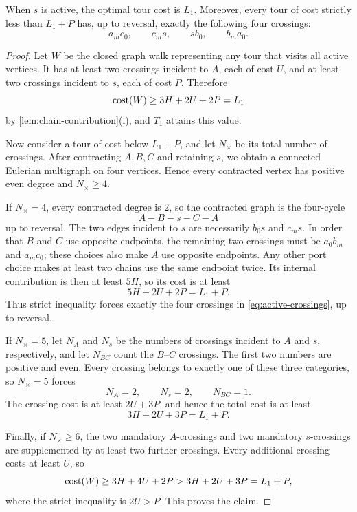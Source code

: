 \documentclass[12pt,a4paper,oneside]{report}
\begin{document}
\begin{lemma}\label{lem:active-low-cost}
When $s$ is active, the optimal tour cost is $L_1$.  Moreover, every tour of
cost strictly less than $L_1+P$ has, up to reversal, exactly the following
four crossings:
\begin{equation}\label{eq:active-crossings}
  a_mc_0,
  \qquad
  c_ms,
  \qquad
  sb_0,
  \qquad
  b_ma_0.
\end{equation}
\end{lemma}

\begin{proof}
Let $W$ be the closed graph walk representing any tour that visits all active
vertices.  It has at least two crossings incident to $A$, each of cost $U$,
and at least two crossings incident to $s$, each of cost $P$.  Therefore
\[
  \operatorname{cost}(W)\ge3H+2U+2P=L_1
\]
by \cref{lem:chain-contribution}(i), and $T_1$ attains this value.

Now consider a tour of cost below $L_1+P$, and let $N_\times$ be its total number of
crossings.  After contracting $A,B,C$ and retaining $s$, we obtain a connected
Eulerian multigraph on four vertices.  Hence every contracted vertex has
positive even degree and $N_\times\ge4$.

If $N_\times=4$, every contracted degree is $2$, so the contracted graph is the four-cycle
\[
  A-B-s-C-A
\]
up to reversal.  The two edges incident to $s$ are necessarily $b_0s$ and
$c_ms$.  In order that $B$ and $C$ use opposite endpoints, the remaining two
crossings must be $a_0b_m$ and $a_mc_0$; these choices also make $A$ use
opposite endpoints.  Any other port choice makes at least two chains use the
same endpoint twice.  Its internal contribution is then at least $5H$, so its
cost is at least
\[
  5H+2U+2P=L_1+P.
\]
Thus strict inequality forces exactly the four crossings in
\cref{eq:active-crossings}, up to reversal.

If $N_\times=5$, let $N_A$ and $N_s$ be the numbers of crossings incident to
$A$ and $s$, respectively, and let $N_{BC}$ count the $B$--$C$ crossings.
The first two numbers are positive and even.  Every crossing belongs to
exactly one of these three categories, so
$N_\times=5$ forces
\[
  N_A=2,
  \qquad
  N_s=2,
  \qquad
  N_{BC}=1.
\]
The crossing cost is at least $2U+3P$, and hence the total cost is at least
\[
  3H+2U+3P=L_1+P.
\]

Finally, if $N_\times\ge6$, the two mandatory $A$-crossings and two mandatory
$s$-crossings are supplemented by at least two further crossings.  Every
additional crossing costs at least $U$, so
\[
  \operatorname{cost}(W)
  \ge3H+4U+2P
  >3H+2U+3P
  =L_1+P,
\]
where the strict inequality is $2U>P$.  This proves the claim.
\end{proof}
\end{document}
